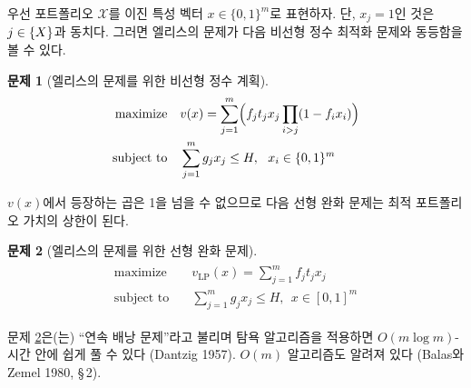 \documentclass[11pt]{article} %
\newif\ifen
\theoremstyle{definition}
\newtheorem{problem}{Problem}
\theoremstyle{definition}
\newtheorem{problem}{문제}
\begin{document}
\ifen
To begin, let us characterize the portfolio $\mathcal{X}$ as the binary vector $x \in \{0, 1\}^m$, where $x_j = 1 $ if and only if $j \in \mathcal\{X\}$. Then it is not difficult to see that Ellis's problem is equivalent to the following integer nonlinear program. 
\else
우선 포트폴리오 $\mathcal{X}$를 이진 특성 벡터 $x \in \{0, 1\}^m$로 표현하자. 단, $x_j = 1 $인 것은 $j \in \mathcal\{X\}$과 동치다. 그러면 엘리스의 문제가 다음 비선형 정수 최적화 문제와 동등함을 볼 수 있다.
\fi
\begin{problem}[\ifen Integer NLP for Ellis's problem\else 엘리스의 문제를 위한 비선형 정수 계획\fi] \label{integernlp}
\begin{align}
\begin{split}
\text{maximize}\quad &  v(x) = \sum_{j=1}^m \Bigl(f_j t_j  x_j \prod_{i > j} (1 - f_{i} x_i) \Bigr)\\
\text{subject to}\quad & \sum_{j=1}^m g_j x_j \leq H, ~~ x_i \in \{0, 1\}^m
\end{split}
\end{align}
\end{problem}
\ifen
\noindent Since the product in $v(x)$ does not exceed one, the following LP relaxation is an upper bound on the valuation of the optimal portfolio.
\else
\noindent $v(x)$에서 등장하는 곱은 1을 넘을 수 없으므로 다음 선형 완화 문제는 최적 포트폴리오 가치의 상한이 된다.
\fi
\begin{problem}[\ifen LP relaxation for Ellis's problem\else 엘리스의 문제를 위한 선형 완화 문제\fi] \label{LPrelaxation}
\begin{align}
\begin{split}
\text{maximize}\quad &  v_{\mathrm{LP}}(x) = \sum_{j=1}^m  f_j t_j x_j \\
\text{subject to}\quad & \sum_{j=1}^m g_j x_j \leq H, ~~ x \in [0, 1]^m
\end{split}
\end{align}
\end{problem}
\ifen
\noindent Problem \ref{LPrelaxation} is a continuous knapsack problem, which is easily solved in $O(m \log m)$-time by a greedy algorithm (Dantzig 1957). Balas and Zemel (1980, \S\,2) provide an $O(m)$ algorithm. 
\else
\noindent 문제 \ref{LPrelaxation}은(는) ``연속 배낭 문제''라고 불리며 탐욕 알고리즘을 적용하면 $O(m \log m)$-시간 안에 쉽게 풀 수 있다 (Dantzig 1957).  $O(m)$ 알고리즘도 알려져 있다 (Balas와 Zemel 1980, \S\,2).
\fi
\end{document}
